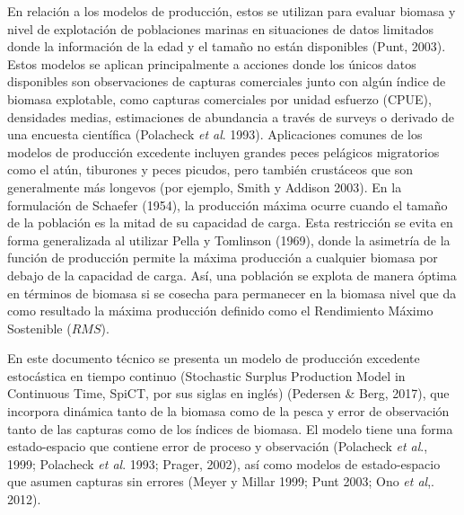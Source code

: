 \documentclass[
  spanish,
]{article}
\begin{document}
En relación a los modelos de producción, estos se utilizan para evaluar
biomasa y nivel de explotación de poblaciones marinas en situaciones de
datos limitados donde la información de la edad y el tamaño no están
disponibles (Punt, 2003). Estos modelos se aplican principalmente a
acciones donde los únicos datos disponibles son observaciones de
capturas comerciales junto con algún índice de biomasa explotable, como
capturas comerciales por unidad esfuerzo (CPUE), densidades medias,
estimaciones de abundancia a través de surveys o derivado de una
encuesta científica (Polacheck \emph{et al}. 1993). Aplicaciones comunes
de los modelos de producción excedente incluyen grandes peces pelágicos
migratorios como el atún, tiburones y peces picudos, pero también
crustáceos que son generalmente más longevos (por ejemplo, Smith y
Addison 2003). En la formulación de Schaefer (1954), la producción
máxima ocurre cuando el tamaño de la población es la mitad de su
capacidad de carga. Esta restricción se evita en forma generalizada al
utilizar Pella y Tomlinson (1969), donde la asimetría de la función de
producción permite la máxima producción a cualquier biomasa por debajo
de la capacidad de carga. Así, una población se explota de manera óptima
en términos de biomasa si se cosecha para permanecer en la biomasa nivel
que da como resultado la máxima producción definido como el Rendimiento
Máximo Sostenible (\(RMS\)).

En este documento técnico se presenta un modelo de producción excedente
estocástica en tiempo continuo (Stochastic Surplus Production Model in
Continuous Time, SpiCT, por sus siglas en inglés) (Pedersen \& Berg,
2017), que incorpora dinámica tanto de la biomasa como de la pesca y
error de observación tanto de las capturas como de los índices de
biomasa. El modelo tiene una forma estado-espacio que contiene error de
proceso y observación (Polacheck \emph{et al}., 1999; Polacheck \emph{et
al}. 1993; Prager, 2002), así como modelos de estado-espacio que asumen
capturas sin errores (Meyer y Millar 1999; Punt 2003; Ono \emph{et al},.
2012).
\end{document}
